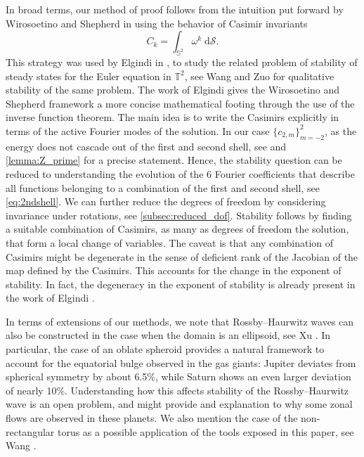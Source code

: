\documentclass{amsart}
\def\esse{{\mathbb{S}}}
\begin{document}
In broad terms, our method of proof follows from the intuition put forward by Wirosoetino and Shepherd in \cite{Wirosoetisno1999} using the behavior of Casimir invariants
$$
C_k=\int_{\esse^2} \omega^k\;\mathrm{d}\mathcal{S}.
$$
This strategy was used by Elgindi in \cite{elgindi2023remarkstabilityenergymaximizers}, to study the related problem of stability of steady states for the Euler equation in $\mathbb{T}^2$, see Wang and Zuo \cite{Wang2023} for qualitative stability of the same problem. The work of Elgindi \cite{elgindi2023remarkstabilityenergymaximizers}
gives the Wirosoetino and Shepherd framework a more concise mathematical footing through the use of the inverse function theorem. The main idea is to write the Casimirs explicitly in terms of the active Fourier modes of the solution. In our case $\{c_{2,m}\}_{m=-2}^2$, as the energy does not cascade out of the first and second shell, see \cite{Wirosoetisno1999,Costantin2022} and \cref{lemma:Z_prime} for a precise statement. Hence, the stability question can be reduced to understanding the evolution of the 6 Fourier coefficients that describe all functions belonging to a combination of the first and second shell, see \eqref{eq:2ndshell}.
We can further reduce the degrees of freedom by considering invariance under rotations, see \cref{subsec:reduced_dof}. Stability follows by finding a suitable combination of Casimirs, as many as degrees of freedom the solution, that form a local change of variables. The caveat is that any combination of Casimirs might be degenerate in the sense of deficient rank of the Jacobian of the map defined by the Casimirs. This accounts for the change in the exponent of stability. In fact, the degeneracy in the exponent of stability is already present in the work of Elgindi \cite{elgindi2023remarkstabilityenergymaximizers}.


In terms of extensions of our methods, we note that Rossby--Haurwitz waves can also be constructed in the case when the domain is an ellipsoid, see Xu \cite{xu2023nonzonalrossbyhaurwitzsolutions2d}. In particular, the case of an oblate spheroid provides a natural framework to account for the equatorial bulge observed in the gas giants: Jupiter deviates from spherical symmetry by about 6.5\%, while Saturn shows an even larger deviation of nearly 10\%. Understanding how this affects stability of the Rossby--Haurwitz wave is an open problem, and might provide and explanation to why some zonal flows are observed in these planets. We also mention the case of the non-rectangular torus as a possible application of the tools exposed in this paper, see Wang \cite{wang2025orbitalstabilitylaplacianeigenstates}.
\end{document}
